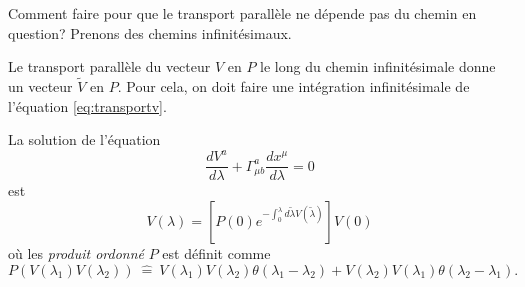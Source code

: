 \documentclass[a4paper,11pt]{report}
\begin{document}
                Comment faire pour que le transport parallèle ne dépende pas du chemin en question? Prenons des chemins infinitésimaux.
                
                Le transport parallèle du vecteur $V$ en $P$ le long du chemin infinitésimale donne un vecteur $\widetilde{V}$ en $P$. Pour cela, on doit faire une intégration infinitésimale de l'équation \ref{eq:transportv}.
                
                \begin{prop}\begin{leftbar}
                    La solution de l'équation
                    \begin{equation}
                        \frac{dV^a}{d\lambda} + \Gamma^a_{\mu b}\frac{dx^\mu}{d\lambda} = 0
                    \end{equation}
                    est 
                    \begin{equation}
                        V(\lambda) = \left[P(0)e^{-\int_0^\lambda d\widetilde{\lambda}V(\widetilde{\lambda})}\right]V(0)
                    \end{equation}
                    où les \textit{produit ordonné} $P$ est définit comme
                    \begin{equation}
                        P\left(V(\lambda_1)V(\lambda_2)\right) ~\hat{=}~ V(\lambda_1) V(\lambda_2)\theta(\lambda_1-\lambda_2)+V(\lambda_2) V(\lambda_1)\theta(\lambda_2-\lambda_1).
                    \end{equation}
                \end{leftbar}\end{prop}
                
\end{document}
